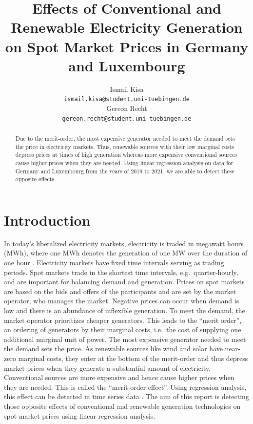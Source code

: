 \documentclass{article}
\title{Effects of Conventional and Renewable Electricity Generation on Spot Market Prices in Germany and Luxembourg}
\author{%
Ismail Kisa\\
\texttt{ismail.kisa@student.uni-tuebingen.de}\\
\And Gereon Recht\\
\texttt{gereon.recht@student.uni-tuebingen.de} \\
}
\begin{document}
\maketitle

\begin{abstract}
Due to the merit-order, the most expensive generator needed to meet the demand sets the price in electricity markets.
Thus, renewable sources with their low marginal costs depress prices at times of high generation whereas more expensive conventional sources cause higher prices when they are needed.
Using linear regression analysis on data for Germany and Luxembourg from the years of 2019 to 2021, we are able to detect these opposite effects.
\end{abstract}

\section{Introduction} \label{sec:intro}
In today's liberalized electricity markets, electricity is traded in megawatt hours (MWh), where one MWh denotes the generation of one MW over the duration of one hour \citep{markets_for_electrical_energy}.
Electricity markets have fixed time intervals serving as trading periods.
Spot markets trade in the shortest time intervals, e.g.\ quarter-hourly, and are important for balancing demand and generation. %
Prices on spot markets are based on the bids and offers of the participants and are set by the market operator, who manages the market.
Negative prices can occur when demand is low and there is an abundance of inflexible generation.
To meet the demand, the market operator prioritizes cheaper generators.
This leads to the \enquote{merit order}, an ordering of generators by their marginal costs, i.e.\ the cost of supplying one additional marginal unit of power.
The most expensive generator needed to meet the demand sets the price.
As renewable sources like wind and solar have near-zero marginal costs, they enter at the bottom of the merit-order and thus depress market prices when they generate a substantial amount of electricity.
Conventional sources are more expensive and hence cause higher prices when they are needed.
This is called the \enquote{merit-order effect}.
Using regression analysis, this effect can be detected in time series data \citep{merit_order_effect_renewable_generation}.
The aim of this report is detecting those opposite effects of conventional and renewable generation technologies on spot market prices using linear regression analysis.
\end{document}

